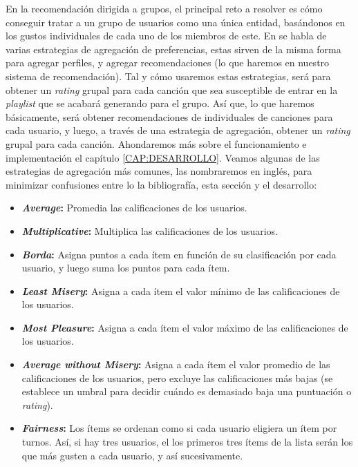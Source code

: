 En la recomendación dirigida a grupos, el principal reto a resolver es cómo conseguir tratar a un grupo de usuarios como una única entidad, basándonos
en los gustos individuales de cada uno de los miembros de este. En \cite{grouprecommender} se habla de varias estrategias de agregación de preferencias,
estas sirven de la misma forma para agregar perfiles, y agregar recomendaciones (lo que haremos en nuestro sistema de recomendación). 
Tal y cómo usaremos estas estrategias, será para obtener un \textit{rating} grupal para cada canción que sea susceptible de entrar en la \textit{playlist}
que se acabará generando para el grupo. Así que, lo que haremos básicamente, será obtener recomendaciones de individuales de canciones para cada usuario, 
y luego, a través de una estrategia de agregación, obtener un \textit{rating} grupal para cada canción. Ahondaremos más sobre el funcionamiento e implementación
el capítulo \ref{CAP:DESARROLLO}. Veamos algunas de las estrategias de agregación más comunes, las nombraremos en inglés, para minimizar confusiones entre lo 
la bibliografía, esta sección y el desarrollo:

\begin{itemize}
    \item \textbf{\textit{Average}:} Promedia las calificaciones de los usuarios.
    \item \textbf{\textit{Multiplicative}:} Multiplica las calificaciones de los usuarios. 
    \item \textbf{\textit{Borda}:} Asigna puntos a cada ítem en función de su clasificación por cada usuario, y luego suma los puntos 
    para cada ítem.
    \item \textbf{\textit{Least Misery}:} Asigna a cada ítem el valor mínimo de las calificaciones de los usuarios.
    \item \textbf{\textit{Most Pleasure}:} Asigna a cada ítem el valor máximo de las calificaciones de los usuarios.
    \item \textbf{\textit{Average without Misery}:} Asigna a cada ítem el valor promedio de las calificaciones de los usuarios, pero
    excluye las calificaciones más bajas (se establece un umbral para decidir cuándo es demasiado baja una puntuación o \textit{rating}).
    \item \textbf{\textit{Fairness}:} Los ítems se ordenan como si cada usuario eligiera un ítem por turnos. Así, si hay tres usuarios, el
    los primeros tres ítems de la lista serán los que más gusten a cada usuario, y así sucesivamente.
\end{itemize}


